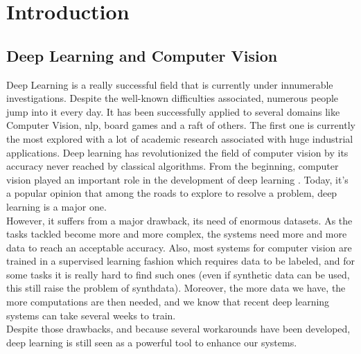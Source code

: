 \documentclass[12pt, a4paper]{report}
\begin{document}
	\makeutbmfrontcover{}

	{
	\hypersetup{linkcolor=black}
	\tableofcontents
	}
	
	\printglossary
	
	\chapter{Introduction}
	\section{Deep Learning and Computer Vision}
	Deep Learning is a really successful field that is currently under innumerable investigations.
	Despite the well-known difficulties associated, numerous people jump into it every day.
	It has been successfully applied to several domains like Computer Vision, \gls{nlp}, board games and a raft of others.
	The first one is currently the most explored with a lot of academic research associated with huge industrial applications.
	Deep learning has revolutionized the field of computer vision by its accuracy never reached by classical algorithms.
	From the beginning, computer vision played an important role in the development of deep learning \cite{lecun_zipcode,lecun_mnist}.
	Today, it's a popular opinion that among the roads to explore to resolve a problem, deep learning is a major one.\\
	However, it suffers from a major drawback, its need of enormous datasets.
	As the tasks tackled become more and more complex, the systems need more and more data to reach an acceptable accuracy.
	Also, most systems for computer vision are trained in a supervised learning fashion which requires data to be labeled, and for some tasks it is really hard to find such ones (even if synthetic data can be used, this still raise the problem of \gls{synthdata}).
	Moreover, the more data we have, the more computations are then needed, and we know that recent deep learning systems can take several weeks to train.\\
	
	Despite those drawbacks, and because several workarounds have been developed, deep learning is still seen as a powerful tool to enhance our systems.
\end{document}
